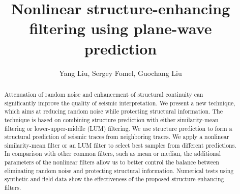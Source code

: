 
%
\title{Nonlinear structure-enhancing filtering using plane-wave prediction}

\renewcommand{\thefootnote}{\fnsymbol{footnote}}


\address{
\footnotemark[1] College of Geo-Exploration Science and Technology,\\
Jilin University \\
No.6 Xi minzhu street, \\
Changchun, China, 130026 \\
\footnotemark[2] Bureau of Economic Geology,\\
John A. and Katherine G. Jackson School of Geosciences \\
The University of Texas at Austin \\
University Station, Box X \\
Austin, TX, USA, 78713-8924 \\
\footnotemark[3] State Key Laboratory of Petroleum Resource and Prospecting,\\
China University of Petroleum-Beijing \\
18 Fuxue road, Changping, \\
Beijing, China, 102249 }

\author{Yang Liu\footnotemark[1]\footnotemark[2], Sergey Fomel\footnotemark[2], 
        Guochang Liu\footnotemark[3]}

\maketitle

\begin{abstract}

Attenuation of random noise and enhancement of structural continuity
can significantly improve the quality of seismic interpretation. We
present a new technique, which aims at reducing random noise while
protecting structural information. The technique is based on combining
structure prediction with either similarity-mean filtering or
lower-upper-middle (LUM) filtering. We use structure prediction to
form a structural prediction of seismic traces from neighboring
traces. We apply a nonlinear similarity-mean filter or an LUM filter
to select best samples from different predictions. In comparison with
other common filters, such as mean or median, the additional
parameters of the nonlinear filters allow us to better control the
balance between eliminating random noise and protecting structural
information. Numerical tests using synthetic and field data show the
effectiveness of the proposed structure-enhancing filters.

\end{abstract}

